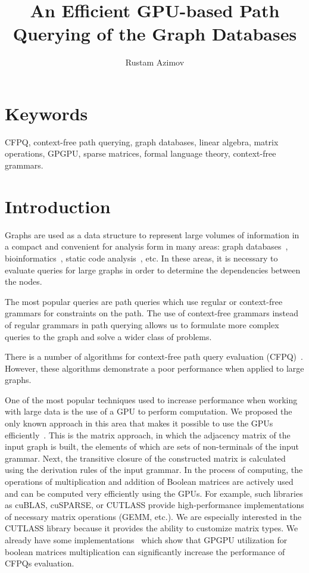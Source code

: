 \documentclass[12pt]{article}  %
\title{An Efficient GPU-based Path Querying of the Graph Databases}
\author{Rustam Azimov}
\date{}
\theoremstyle{remark}
\begin{document}

\maketitle

\section*{Keywords}
CFPQ, context-free path querying, graph databases, linear algebra, matrix operations, GPGPU, sparse matrices, formal language theory, context-free grammars.

\section{Introduction}
Graphs are used as a data structure to represent large volumes of information in a compact and convenient for analysis form in many areas: graph databases~\cite{redis,graphDB, kuijpers2019experimental}, bioinformatics~\cite{have2013graph, GraphQueryWithEarley}, static code analysis~\cite{kodumal2004set, zhang2013fast}, etc. In these areas, it is necessary to evaluate queries for large graphs in order to determine the dependencies between the nodes. 

The most popular queries are path queries which use regular or context-free grammars for constraints on the path. 
The use of context-free grammars instead of regular grammars in path querying allows us to formulate more complex queries to the graph and solve a wider class of problems.

There is a number of algorithms for context-free path query evaluation (CFPQ)~\cite{GraphQueryWithEarley, GLL, hellingsRelational, RDF}. 
However, these algorithms demonstrate a poor performance when applied to large graphs.

One of the most popular techniques used to increase performance when working with large data is the use of a GPU to perform computation. 
We proposed the only known approach in this area that makes it possible to use the GPUs efficiently~\cite{azimov2018context}. 
This is the matrix approach, in which the adjacency matrix of the input graph is built, the elements of which are sets of non-terminals of the input grammar. Next, the transitive closure of the constructed matrix is calculated using the derivation rules of the input grammar. In the process of computing, the operations of multiplication and addition of Boolean matrices are actively used and can be computed very efficiently using the GPUs. For example, such libraries as cuBLAS, cuSPARSE, or CUTLASS provide high-performance implementations of necessary matrix operations (GEMM, etc.). We are especially interested in the CUTLASS library because it provides the ability to customize matrix types. We already have some implementations~\cite{mishin2019evaluation} which show that GPGPU utilization for boolean matrices multiplication can significantly increase the performance of CFPQs evaluation.
\end{document}

